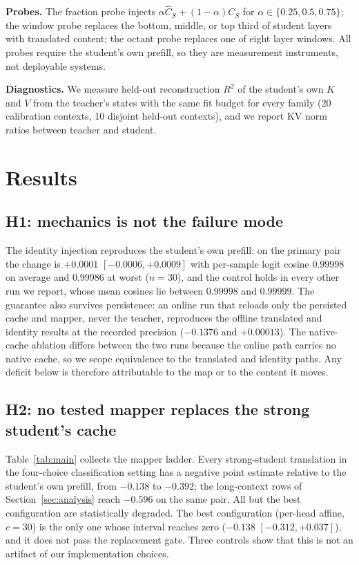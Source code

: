 \documentclass[10pt]{article}
\newcommand{\kv}{\ensuremath{\mathrm{KV}}}
\begin{document}
\textbf{Probes.} The fraction probe injects
$\alpha\widehat C_S+(1-\alpha)C_S$ for $\alpha\in\{0.25,0.5,0.75\}$; the window
probe replaces the bottom, middle, or top third of student layers with
translated content; the octant probe replaces one of eight layer windows. All
probes require the student's own prefill, so they are measurement instruments,
not deployable systems.

\textbf{Diagnostics.} We measure held-out reconstruction $R^2$ of the student's
own $K$ and $V$ from the teacher's states with the same fit budget for every
family (20 calibration contexts, 10 disjoint held-out contexts), and we report
\kv{} norm ratios between teacher and student.


\section{Results}
\label{sec:results}

\subsection{H1: mechanics is not the failure mode}
\label{sec:h1}
The identity injection reproduces the student's own prefill: on the primary pair
the change is $+0.0001$ $[-0.0006,+0.0009]$ with per-sample logit cosine $0.99998$
on average and $0.99986$ at worst ($n{=}30$), and the control holds in every
other run we report, whose mean cosines lie between $0.99998$ and $0.99999$.
The guarantee also survives persistence: an online run that
reloads only the persisted cache and mapper, never the teacher, reproduces the
offline translated and identity results at the recorded precision ($-0.1376$ and
$+0.00013$). The native-cache ablation differs between the two runs because the
online path carries no native cache, so we scope equivalence to the translated
and identity paths. Any deficit below is therefore attributable to the map or to
the content it moves.

\subsection{H2: no tested mapper replaces the strong student's cache}
\label{sec:h2}
Table~\ref{tab:main} collects the mapper ladder. Every strong-student
translation in the four-choice classification setting has a negative point
estimate relative to the student's own prefill, from $-0.138$ to $-0.392$; the
long-context rows of Section~\ref{sec:analysis} reach $-0.596$ on the same pair.
All but the best configuration are statistically degraded. The best configuration (per-head affine, $c{=}30$) is
the only one whose interval reaches zero ($-0.138$ $[-0.312,+0.037]$), and it does not
pass the replacement gate.
Three controls show that this is not an artifact of our implementation choices.
\end{document}
